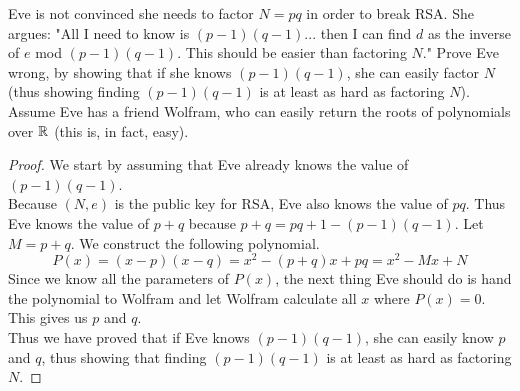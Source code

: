 \documentclass[11pt]{article}
\begin{document}
\newpage
{}
Eve is not convinced she needs to factor $N = pq$ in order to break RSA. She argues: "All I need to know is $(p-1)(q-1)$... then I can find $d$
as the inverse of $e$ mod $(p-1)(q-1)$. This should be easier than factoring $N$." Prove Eve wrong, by showing that if she knows $(p-1)(q-1)$,
she can easily factor $N$ (thus showing finding $(p-1)(q-1)$ is at least as hard as factoring $N$). Assume Eve has a friend Wolfram, who can easily return the
roots of polynomials over $\mathbb{R}$ (this is, in fact, easy).

\begin{Answer}
    \begin{proof}
        We start by assuming that Eve already knows the value of $(p-1)(q-1)$. \\ 
        Because $(N,e)$ is the public key for RSA, Eve also knows the value of $pq$. Thus Eve knows the value of $p+q$ because 
        $p+q = pq + 1 - (p-1)(q-1)$. Let $M=p+q$. We construct the following polynomial. 
        $$P(x) = (x - p)(x - q) = x^2 - (p + q)x + pq = x^2 - Mx + N$$
        Since we know all the parameters of $P(x)$, the next thing Eve should do is hand the polynomial to Wolfram and let Wolfram
        calculate all $x$ where $P(x) = 0$. This gives us $p$ and $q$. \\ 
        Thus we have proved that if Eve knows $(p-1)(q-1)$, she can easily know $p$ and $q$, thus showing that finding $(p-1)(q-1)$ is at least
        as hard as factoring $N$. 
    \end{proof}
\end{Answer}

\newpage
{}
\end{document}
